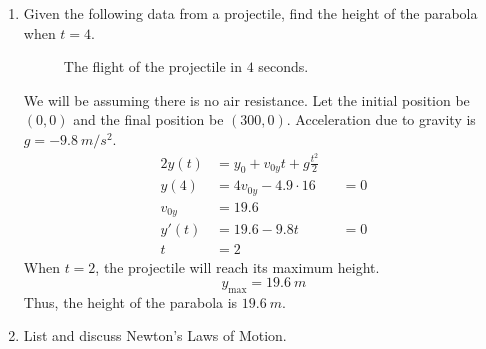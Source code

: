 \begin{enumerate}
\begin{figure}[H]
    \centering
    
    \caption{An electron from a cathode ray tube TV moving towards the screen.}
    \label{NUPOCphysics11}
  \end{figure}
  Let's assume the electron has mass \(m\).
  Since the field \(E\) is downward and the electron is negative, there will be
  an upwards force on the electron.
  Since \(d = v_{0x}t\), we have that \(t = \frac{d}{v_{0x}}\) but
  \(t = \frac{L}{v_{0x}}\).
  The upward force on the electron is \(F_e = eE\).
  By Newton's second law,
  \[
  F_e = ma\Rightarrow a = \frac{eE}{m}.
  \]
  When the electron enters the field, \(v_{0y} = 0\) and \(y_0 = 0\).
  Then \(y(t) = a\frac{t^2}{2} = \frac{eEl^2}{2mv_{0x}^2}\).
  This is the distance above \(\frac{d}{2}\) where the electron strikes.
  If \(\frac{eEl^2}{2mv_{0x}^2} > \frac{d}{2}\), then
  \(\frac{eEl^2}{mv_{0x}^2} > d\) which is above the screen so the electron
  misses.
  Suppose \(E\) is uniform.
  Then \(E = \frac{+V}{d}\) and
  \[
  y(t) = \frac{e(+V)L^2}{2mdv_{0x}^2}.\eqnumtag\label{crt}
  \]
  In \cref{crt}, \(L\), \(m\), and \(d\) are fixed.
  By changing the top plate potential, \(+V\), and the velocity of the
  electron, we can alter the the location of the electron striking the screen.
\item
  Given the following data from a projectile, find the height of the parabola
  when \(t = 4\).
  \begin{figure}[H]
    \centering
    
    \caption{The flight of the projectile in \(4\) seconds.}
  \end{figure}
  We will be assuming there is no air resistance.
  Let the initial position be \((0, 0)\) and the final position be
  \((300, 0)\).
  Acceleration due to gravity is \(g = -9.8 \ m/s^2\).
  \begin{alignat*}{2}
    y(t) &= y_0 + v_{0y}t + g\frac{t^2}{2}\\
    y(4) &= 4v_{0y} - 4.9\cdot 16 && = {} 0\\
    v_{0y} &= 19.6\\
    y'(t) &= 19.6 - 9.8t && = {} 0\\
    t &= 2
  \end{alignat*}
  When \(t = 2\), the projectile will reach its maximum height.
  \[
  y_{\max} = 19.6 \ m
  \]
  Thus, the height of the parabola is \(19.6 \ m\).
\item
  List and discuss Newton's Laws of Motion.
  \par\smallskip

\end{enumerate}
